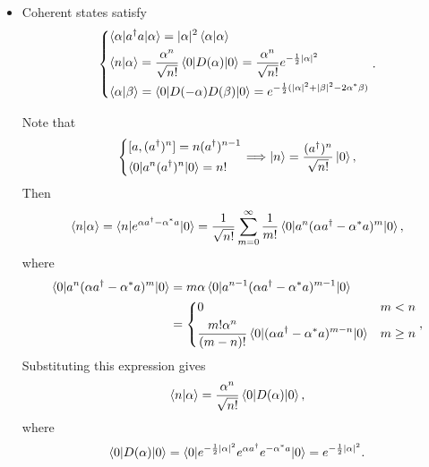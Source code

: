 \documentclass[10pt, a4paper]{article}
\numberwithin{equation}{section}
\begin{document}
\begin{itemize}
		\item Coherent states satisfy
		\begin{equation}
			\begin{dcases}
				\braket{\alpha | a^\dag a | \alpha} = |\alpha|^2 \braket{\alpha | \alpha} \\
				\braket{n | \alpha} = \frac{\alpha^n}{\sqrt{n!}} \braket{0 | D(\alpha) | 0} = \frac{\alpha^n}{\sqrt{n!}} e^{- \frac{1}{2} |\alpha|^2} \\
				\braket{\alpha | \beta} = \braket{0 | D(- \alpha) D(\beta) | 0} = e^{- \frac{1}{2} (|\alpha|^2 + |\beta|^2 - 2 \alpha^* \beta)}
			\end{dcases}.
		\end{equation}
		
		\begin{tcolorbox}[title=Calculation:]
			Note that
			\begin{equation}
				\begin{dcases}
					[a, (a^\dag)^n] = n (a^\dag)^{n - 1} \\
					\braket{0 | a^n (a^\dag)^n | 0} = n!
				\end{dcases} \Longrightarrow \ket{n} = \frac{(a^\dag)^n}{\sqrt{n!}} \ket{0},
			\end{equation}
			Then
			\begin{equation}
				\braket{n | \alpha} = \braket{n | e^{\alpha a^\dag - \alpha^* a} | 0} = \frac{1}{\sqrt{n!}} \sum_{m = 0}^\infty \frac{1}{m!} \braket{0 | a^n (\alpha a^\dag - \alpha^* a)^m | 0},
			\end{equation}
			where
			\begin{align}
				\braket{0 | a^n (\alpha a^\dag - \alpha^* a)^m | 0} &= m \alpha \braket{0 | a^{n - 1} (\alpha a^\dag - \alpha^* a)^{m - 1} | 0} \notag \\
				&= \begin{dcases}
					0 & m < n \\
					\frac{m! \alpha^n}{(m - n)!} \braket{0 | (\alpha a^\dag - \alpha^* a)^{m - n} | 0} & m \geq n
				\end{dcases},
			\end{align}
			Substituting this expression gives
			\begin{equation}
				\braket{n | \alpha} = \frac{\alpha^n}{\sqrt{n!}} \braket{0 | D(\alpha) | 0},
			\end{equation}
			where
			\begin{align}
				\braket{0 | D(\alpha) | 0} = \braket{0 | e^{- \frac{1}{2} |\alpha|^2} e^{\alpha a^\dag} e^{- \alpha^* a} | 0} = e^{- \frac{1}{2} |\alpha|^2}.
			\end{align}
		\end{tcolorbox}
		

\end{itemize}
\end{document}
